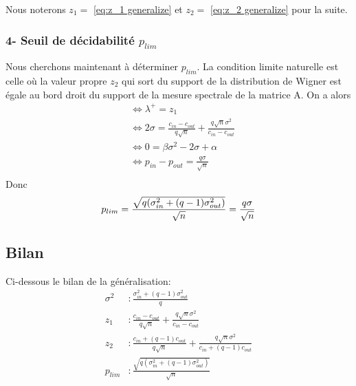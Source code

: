 Nous noterons $z_1 =$ \eqref{eq:z_1 generalize}  et $z_2 =$ \eqref{eq:z_2 generalize} pour la suite.
 

\subsubsection*{4- Seuil de décidabilité $p_{lim}$}
Nous cherchons maintenant à déterminer $p_{lim}$.
La condition limite naturelle est celle où la valeur propre $z_2$ qui sort du support de la distribution de Wigner est égale au bord droit du support de la mesure spectrale de la matrice A.
On a alors 
\begin{align*}
	&\Leftrightarrow \lambda^+ = z_1\\
	&\Leftrightarrow 2 \sigma = \frac{c_{in} - c_{out}}{q\sqrt{n}} + \frac{q\sqrt{n}\sigma^2}{c_{in} - c_{out}}\\
	&\Leftrightarrow 0 = \beta \sigma^2 - 2 \sigma + \alpha \\
	&\Leftrightarrow p_{in} - p_{out} = \frac{q\sigma}{\sqrt{n}}  \\
\end{align*}
Donc
\begin{equation}
	p_{lim} = \frac{\sqrt{q(\sigma_{in}^2 + (q-1)\sigma_{out}^2)}}{\sqrt{n}} = \frac{q\sigma}{\sqrt{n}}  \\
\end{equation}


\subsection{Bilan}
Ci-dessous le bilan de la généralisation:
\begin{align*}
	\sigma^2&: \frac{\sigma_{in}^2 + (q-1)\sigma_{out}^2}{q} \\
	z_1&: \frac{c_{in} - c_{out}}{q\sqrt{n}} + \frac{q\sqrt{n}\sigma^2}{c_{in} - c_{out}}\\
	z_2&: \frac{c_{in} + (q-1)c_{out}}{q\sqrt{n}} + \frac{q\sqrt{n}\sigma^2}{c_{in} + (q-1)c_{out}}\\
	p_{lim}&: \frac{\sqrt{q(\sigma_{in}^2 + (q-1)\sigma_{out}^2)}}{\sqrt{n}} \\
\end{align*}

